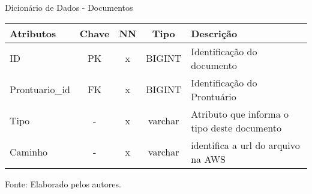 \documentclass[
    12pt,               %
    openright,          %
    oneside,
    a4paper,            %
    BIBLATEX,           %
    TODO,               %
    english,            %
    brazil              %
    ]{ifsp-spo-inf-ctds}
\begin{document}
                    \begin{center}
                        \begin{quadro}[H]
                        \centering
                            \caption{Dicionário de Dados - Documentos}
                            \begin{tabulary}{1.0\textwidth}{|p{9em}|c|c|c|p{19em}|}
                          \hline
                          Atributos & Chave & NN & Tipo & Descrição\\
                          \hline
                          ID & PK & x & BIGINT & Identificação do documento \\
                          \hline
                          Prontuario\_id & FK & x & BIGINT & Identificação do Prontuário \\
                          \hline
                          Tipo & - & x & varchar & Atributo que informa o tipo deste documento \\
                          \hline
                          Caminho & - & x & varchar & identifica a url do arquivo na AWS\\
                          \hline
                          \end{tabulary}

                            \label{qd: md-documento}
                            \centering
                          {\footnotesize Fonte: Elaborado pelos autores.}
                        \end{quadro}
                      \end{center} 
\end{document}
